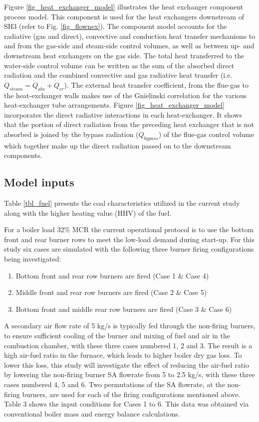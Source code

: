 \documentclass[11pt,cleanfoot]{asme2ej}
\begin{document}
Figure \ref{fig_heat_exchanger_model} illustrates the heat exchanger component process model. This component is used for the heat exchangers downstream of SH3 (refer to Fig. \ref{fig_flownex}). The component model accounts for the radiative (gas and direct), convective and conduction heat transfer mechanisms to and from the gas-side and steam-side control volumes, as well as between up- and downstream heat exchangers on the gas side. The total heat transferred to the water-side control volume can be written as the sum of the absorbed direct radiation and the combined convective and gas radiative heat transfer (i.e. $\dot{Q}_{steam}=\dot{Q}_{abs}+\dot{Q}_{cr}$). The external heat transfer coefficient, from the flue-gas to the heat-exchanger walls makes use of the Gnielinski correlation \cite{Gnielinski2016} for the various heat-exchanger tube arrangements. Figure \ref{fig_heat_exchanger_model} incorporates the direct radiative interactions in each heat-exchanger. It shows that the portion of direct radiation from the preceding heat exchanger that is not absorbed is joined by the bypass radiation ($\dot{Q}_{bypass}$) of the flue-gas control volume which together make up  the direct radiation passed on to the downstream components.

\subsection{Model inputs}
Table \ref{tbl_fuel} presents the coal characteristics utilized in the current study along with the higher heating value (HHV) of the fuel.

For a boiler load 32\% MCR the current operational protocol is to use the bottom front and rear burner rows to meet the low-load demand during start-up.  For this study six cases are simulated with the following three burner firing configurations being investigated:

\begin{enumerate}
\item Bottom front and rear row burners are fired (Case 1 \& Case 4)
\item Middle front and rear row burners are fired (Case 2 \& Case 5)
\item Bottom front and middle rear row burners are fired (Case 3 \& Case 6)
\end{enumerate}

A secondary air flow rate of 5 kg/s is typically fed through the non-firing burners, to ensure sufficient cooling of the burner and mixing of fuel and air in the combustion chamber, with these three cases numbered 1, 2 and 3. The result is a high air-fuel ratio in the furnace, which leads to higher boiler dry gas loss. To lower this loss, this study will investigate the effect of reducing the air-fuel ratio by lowering the non-firing burner SA flowrate from 5 to 2.5 kg/s, with these three cases numbered 4, 5 and 6. Two permutations of the SA flowrate, at the non-firing burners, are used for each of the firing configurations mentioned above. Table 3 shows the input conditions for Cases 1 to 6. This data was obtained via conventional boiler mass and energy balance calculations.
\end{document}

